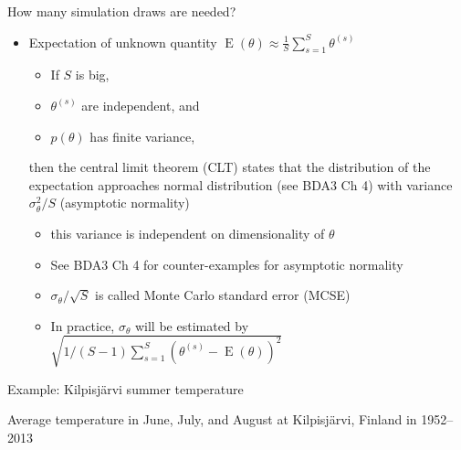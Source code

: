 \documentclass[english,t]{beamer}
\DeclareMathOperator{\E}{E}
\begin{document}
\begin{frame}{How many simulation draws are needed?}

  \begin{itemize}
  \item Expectation of unknown quantity $\E(\theta)\approx \frac{1}{S}\sum_{s=1}^S \theta^{(s)}$
    \begin{itemize}
    \item If $S$ is big,
    \item $\theta^{(s)}$ are independent, and 
    \item $p(\theta)$ has finite variance,
    \end{itemize}
    then the central limit theorem (CLT) states
    that the distribution of the expectation approaches normal
    distribution (see BDA3 Ch 4) with variance $\sigma^2_\theta/S$
    (asymptotic normality)
    \begin{itemize}
    \item<1-> this variance is independent on dimensionality of $\theta$
    \item<2-> See BDA3 Ch 4 for counter-examples for asymptotic normality
      \pause
    \item<3-> $\sigma_\theta/\sqrt{S}$ is called Monte Carlo standard
      error (MCSE)
      \item<4-> In practice, $\sigma_{\theta}$ will be estimated by $ \sqrt{1/(S-1)\sum_{s = 1}^S (\theta^{(s)} - \E(\theta))^2}$
    \end{itemize}
\end{itemize}

\end{frame}

\begin{frame}{Example: Kilpisjärvi summer temperature}

  Average temperature in June, July, and August at Kilpisjärvi,
  Finland in 1952--2013

  \begin{center}
  \end{center}

\end{frame}
\end{document}

